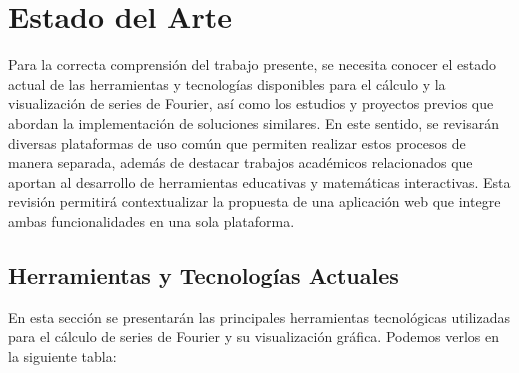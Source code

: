 \chapter{Estado del Arte}\label{ch:Estado del Arte}
Para la correcta comprensión del trabajo presente, se necesita conocer el estado actual de las herramientas y tecnologías disponibles para el cálculo y la visualización de series de Fourier, así como los estudios y proyectos previos que abordan la implementación de soluciones similares. En este sentido, se revisarán diversas plataformas de uso común que permiten realizar estos procesos de manera separada, además de destacar trabajos académicos relacionados que aportan al desarrollo de herramientas educativas y matemáticas interactivas. Esta revisión permitirá contextualizar la propuesta de una aplicación web que integre ambas funcionalidades en una sola plataforma.

\section{Herramientas y Tecnologías Actuales}
En esta sección se presentarán las principales herramientas tecnológicas utilizadas para el cálculo de series de Fourier y su visualización gráfica. Podemos verlos en la siguiente tabla:

